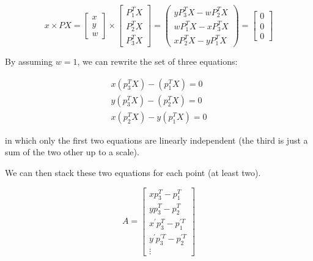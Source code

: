 \begin{equation}
    x \times PX = \left[
    \begin{array}{c}
        x \\ y \\ w
    \end{array}\right]
    \times
    \left[\begin{array}{c}
        P_1^T X \\ P_2^T X \\ P_3^T X
    \end{array}\right]
    =
    \left(\begin{array}{c}
        yP_3^TX-wP_2^TX \\
        wP_1^TX-xP_3^TX \\
        xP_2^TX-yP_1^TX 
    \end{array}\right)
    = \left[\begin{array}{c}
         0 \\ 0 \\ 0
    \end{array}\right]
\end{equation}

By assuming $w = 1$, we can rewrite the set of three equations:

\begin{equation}
    \begin{split}
        x(p_3^TX) - (p_ 1^TX) = 0 \\
        y(p_ 3^TX) - (p_ 2^TX) = 0 \\
        x(p_2^TX) - y(p_1^TX) = 0
    \end{split}
\end{equation}

in which only the first two equations are linearly independent (the third is just a sum of the two other up to a scale).

We can then stack these two equations for each point (at least two).

\begin{equation}
    A = \left[\begin{array}{c}
        xp_3^T - p_1^T \\
        yp_3^T - p_2^T \\
        x^\prime p_3^T - p_1^{\prime T} \\
        y^\prime p_3^{\prime T} - p_2^{\prime T} \\
        \vdots
    \end{array}\right]
\end{equation}

